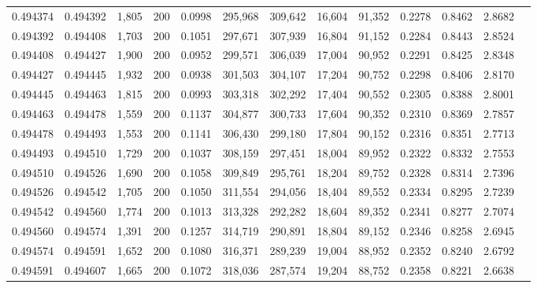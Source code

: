 \begin{tabular}{rrrrrrrrrrrrr}
0.494374 & 0.494392 &  1,805 & 200 &                                     0.0998 & 295,968 & 309,642 &  16,604 &  91,352 & 0.2278 & 0.8462 & 2.8682 \\
0.494392 & 0.494408 &  1,703 & 200 &                                     0.1051 & 297,671 & 307,939 &  16,804 &  91,152 & 0.2284 & 0.8443 & 2.8524 \\
0.494408 & 0.494427 &  1,900 & 200 &                                     0.0952 & 299,571 & 306,039 &  17,004 &  90,952 & 0.2291 & 0.8425 & 2.8348 \\
0.494427 & 0.494445 &  1,932 & 200 &                                     0.0938 & 301,503 & 304,107 &  17,204 &  90,752 & 0.2298 & 0.8406 & 2.8170 \\
0.494445 & 0.494463 &  1,815 & 200 &                                     0.0993 & 303,318 & 302,292 &  17,404 &  90,552 & 0.2305 & 0.8388 & 2.8001 \\
0.494463 & 0.494478 &  1,559 & 200 &                                     0.1137 & 304,877 & 300,733 &  17,604 &  90,352 & 0.2310 & 0.8369 & 2.7857 \\
0.494478 & 0.494493 &  1,553 & 200 &                                     0.1141 & 306,430 & 299,180 &  17,804 &  90,152 & 0.2316 & 0.8351 & 2.7713 \\
0.494493 & 0.494510 &  1,729 & 200 &                                     0.1037 & 308,159 & 297,451 &  18,004 &  89,952 & 0.2322 & 0.8332 & 2.7553 \\
0.494510 & 0.494526 &  1,690 & 200 &                                     0.1058 & 309,849 & 295,761 &  18,204 &  89,752 & 0.2328 & 0.8314 & 2.7396 \\
0.494526 & 0.494542 &  1,705 & 200 &                                     0.1050 & 311,554 & 294,056 &  18,404 &  89,552 & 0.2334 & 0.8295 & 2.7239 \\
0.494542 & 0.494560 &  1,774 & 200 &                                     0.1013 & 313,328 & 292,282 &  18,604 &  89,352 & 0.2341 & 0.8277 & 2.7074 \\
0.494560 & 0.494574 &  1,391 & 200 &                                     0.1257 & 314,719 & 290,891 &  18,804 &  89,152 & 0.2346 & 0.8258 & 2.6945 \\
0.494574 & 0.494591 &  1,652 & 200 &                                     0.1080 & 316,371 & 289,239 &  19,004 &  88,952 & 0.2352 & 0.8240 & 2.6792 \\
0.494591 & 0.494607 &  1,665 & 200 &                                     0.1072 & 318,036 & 287,574 &  19,204 &  88,752 & 0.2358 & 0.8221 & 2.6638 \\

\end{tabular}

